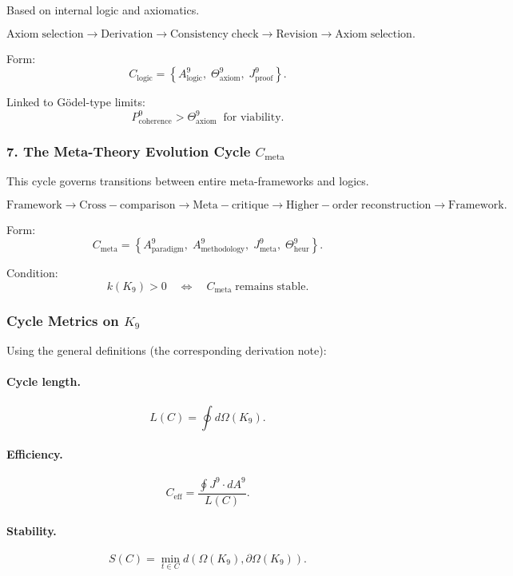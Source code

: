 Based on internal logic and axiomatics.

\[
  \mathrm{Axiom\;selection}
  \to
  \mathrm{Derivation}
  \to
  \mathrm{Consistency\;check}
  \to
  \mathrm{Revision}
  \to
  \mathrm{Axiom\;selection}.
\]

Form:
\[
 C_{\mathrm{logic}}
  =
  \left\{
    A^9_{\mathrm{logic}},\;
    \Theta^9_{\mathrm{axiom}},\;
    J^9_{\mathrm{proof}}
  \right\}.
\]

Linked to Gödel-type limits:
\[
  P^9_{\mathrm{coherence}} > \Theta^9_{\mathrm{axiom}}
  \;\;\text{for viability}.
\]


\subsubsection{7. The Meta-Theory Evolution Cycle $C_{\mathrm{meta}}$}

This cycle governs transitions between entire meta-frameworks and logics.

\[
  \mathrm{Framework}
  \to
  \mathrm{Cross\!-\!comparison}
  \to
  \mathrm{Meta\!-\!critique}
  \to
  \mathrm{Higher\!-\!order\;reconstruction}
  \to
  \mathrm{Framework}.
\]

Form:
\[
 C_{\mathrm{meta}}
 =
 \left\{
   A^9_{\mathrm{paradigm}},\;
   A^9_{\mathrm{methodology}},\;
   J^9_{\mathrm{meta}},\;
   \Theta^9_{\mathrm{heur}}
 \right\}.
\]

Condition:
\[
  k(K_9) > 0 \quad\Leftrightarrow\quad
  C_{\mathrm{meta}}\;\text{remains stable}.
\]


\subsubsection{Cycle Metrics on \texorpdfstring{$K_9$}{K_9}}

Using the general definitions (the corresponding derivation note):

\paragraph{Cycle length.}
\[
  L(C) = \oint d\Omega(K_9).
\]

\paragraph{Efficiency.}
\[
  C_{\mathrm{eff}} =
  \frac{\oint J^9 \cdot dA^9}{L(C)}.
\]

\paragraph{Stability.}
\[
  S(C)
    = \min_{t\in C}
      d(\Omega(K_9),\partial\Omega(K_9)).
\]

